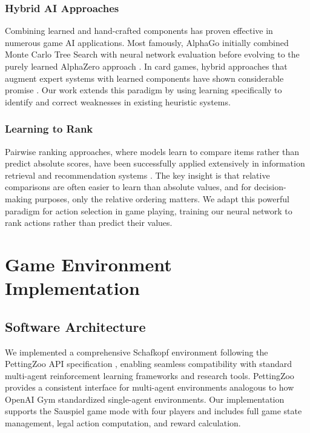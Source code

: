 \documentclass[conference]{IEEEtran}
\begin{document}
\subsubsection{Hybrid AI Approaches}
Combining learned and hand-crafted components has proven effective in numerous game AI applications. Most famously, AlphaGo initially combined Monte Carlo Tree Search with neural network evaluation before evolving to the purely learned AlphaZero approach \cite{silver2016mastering}. In card games, hybrid approaches that augment expert systems with learned components have shown considerable promise \cite{ginsberg2001gib}. Our work extends this paradigm by using learning specifically to identify and correct weaknesses in existing heuristic systems.

\subsubsection{Learning to Rank}
Pairwise ranking approaches, where models learn to compare items rather than predict absolute scores, have been successfully applied extensively in information retrieval \cite{burges2010ranknet} and recommendation systems \cite{rendle2012bpr}. The key insight is that relative comparisons are often easier to learn than absolute values, and for decision-making purposes, only the relative ordering matters. We adapt this powerful paradigm for action selection in game playing, training our neural network to rank actions rather than predict their values.

\section{Game Environment Implementation}

\subsection{Software Architecture}

We implemented a comprehensive Schafkopf environment following the PettingZoo API specification \cite{terry2021pettingzoo}, enabling seamless compatibility with standard multi-agent reinforcement learning frameworks and research tools. PettingZoo provides a consistent interface for multi-agent environments analogous to how OpenAI Gym standardized single-agent environments. Our implementation supports the Sauspiel game mode with four players and includes full game state management, legal action computation, and reward calculation.
\end{document}
